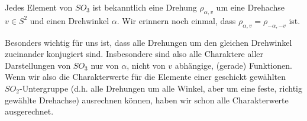 \begin{remark}
Jedes Element von $SO_3$ ist bekanntlich eine Drehung $\rho_{\alpha,v}$ um eine Drehachse $v\in S^2$ und einen Drehwinkel $\alpha$. Wir erinnern noch einmal, dass $\rho_{\alpha,v} =\rho_{-\alpha,-v}$ ist.

\smallbreak
Besonders wichtig für uns ist, dass alle Drehungen um den gleichen Drehwinkel zueinander konjugiert sind. Insbesondere sind also alle Charaktere aller Darstellungen von $SO_3$ nur von $\alpha$, nicht von $v$ abhängige, (gerade) Funktionen. Wenn wir also die Charakterwerte für die Elemente einer geschickt gewählten $SO_2$-Untergruppe (d.h. alle Drehungen um alle Winkel, aber um eine feste, richtig gewählte Drehachse) ausrechnen können, haben wir schon alle Charakterwerte ausgerechnet. 
\end{remark}


